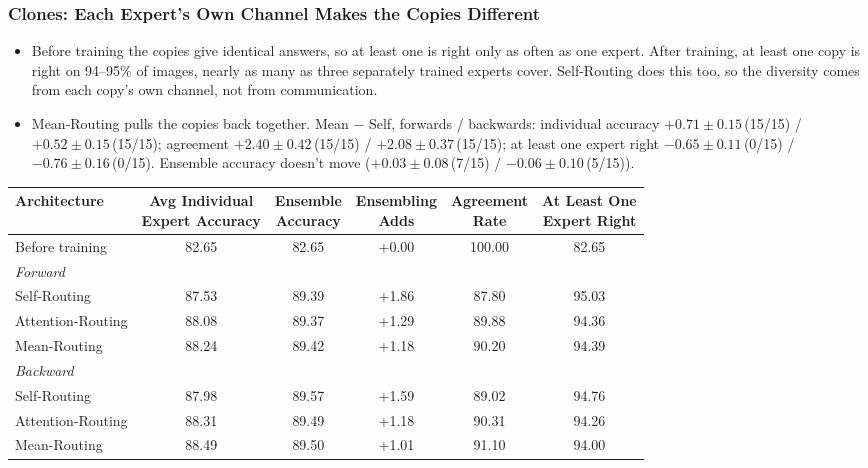 \documentclass[11pt,a4paper]{article}
\newcommand{\tnote}[1]{\par\vspace{0.6ex}{\footnotesize #1}\par}
\newcommand{\pmse}[3]{$#1 \pm #2$\,(#3/15)}
\newcommand{\panel}[1]{\multicolumn{1}{l}{\textit{#1}}}
\newcommand{\finding}[2][12]{\Needspace{#1\baselineskip}\subsubsection*{#2}}
\begin{document}
\finding[22]{Clones: Each Expert's Own Channel Makes the Copies Different}

\begin{itemize}
  \item Before training the copies give identical answers, so at least one is right only as often
        as one expert. After training, at least one copy is right on 94--95\% of images, nearly as
        many as three separately trained experts cover. Self-Routing does this too, so the
        diversity comes from each copy's own channel, not from communication.
  \item Mean-Routing pulls the copies back together. Mean $-$ Self, forwards / backwards:
        individual accuracy \pmse{+0.71}{0.15}{15} / \pmse{+0.52}{0.15}{15}; agreement
        \pmse{+2.40}{0.42}{15} / \pmse{+2.08}{0.37}{15}; at least one expert right
        \pmse{-0.65}{0.11}{0} / \pmse{-0.76}{0.16}{0}. Ensemble accuracy doesn't move
        (\pmse{+0.03}{0.08}{7} / \pmse{-0.06}{0.10}{5}).
\end{itemize}

\begin{center}
\small
\begin{tabular}{@{}lccccc@{}}
\toprule
Architecture
& \shortstack{Avg Individual\\Expert Accuracy}
& \shortstack{Ensemble\\Accuracy}
& \shortstack{Ensembling\\Adds}
& \shortstack{Agreement\\Rate}
& \shortstack{At Least One\\Expert Right} \\
\midrule
Before training & 82.65 & 82.65 & +0.00 & 100.00 & 82.65 \\
\midrule
\panel{Forward} \\
\quad Self-Routing      & 87.53 & 89.39 & +1.86 & 87.80 & 95.03 \\
\quad Attention-Routing & 88.08 & 89.37 & +1.29 & 89.88 & 94.36 \\
\quad Mean-Routing      & 88.24 & 89.42 & +1.18 & 90.20 & 94.39 \\
\midrule
\panel{Backward} \\
\quad Self-Routing      & 87.98 & 89.57 & +1.59 & 89.02 & 94.76 \\
\quad Attention-Routing & 88.31 & 89.49 & +1.18 & 90.31 & 94.26 \\
\quad Mean-Routing      & 88.49 & 89.50 & +1.01 & 91.10 & 94.00 \\
\bottomrule
\end{tabular}
\tnote{All values in \%.}
\end{center}
\end{document}
